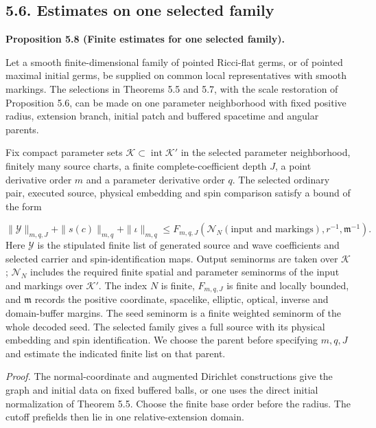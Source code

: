 \documentclass[
  english,
  11pt,
  reqno]{amsart}
\makeatletter
\newcommand{\pandocstatementheading}[1]{%
  \par\addpenalty{\@beginparpenalty}%
  \addvspace{.5\baselineskip plus .2\baselineskip minus .2\baselineskip}%
  {\normalfont\bfseries #1\par}%
  \nobreak\@afterindenttrue\@afterheading
}
\makeatother
\begin{document}
\subsection{5.6. Estimates on one selected
family}\label{estimates-on-one-selected-family}\label{sec:submission-selected-family-estimates}

\pandocstatementheading{\leavevmode{}\label{prop:submission-coverage-family-estimates}Proposition 5.8 (Finite estimates for one selected family).}

Let a smooth finite-dimensional family of pointed Ricci-flat germs, or
of pointed maximal initial germs, be supplied on common local
representatives with smooth markings. The selections in Theorems 5.5 and
5.7, with the scale restoration of Proposition 5.6, can be made on one
parameter neighborhood with fixed positive radius, extension branch,
initial patch and buffered spacetime and angular parents.

Fix compact parameter sets
\(\mathcal K\subset\operatorname{int}\mathcal K'\) in the selected
parameter neighborhood, finitely many source charts, a finite
complete-coefficient depth \(J\), a point derivative order \(m\) and a
parameter derivative order \(q\). The selected ordinary pair, executed
source, physical embedding and spin comparison satisfy a bound of the
form

\label{eq:submission-coverage-family-bound} \[
\|\mathcal Y\|_{m,q,J}
+
\|s(c)\|_{m,q}
+
\|\iota\|_{m,q}
\le
F_{m,q,J}
\left(
\mathcal N_N(\text{input and markings}),
r^{-1},
\mathfrak m^{-1}
\right).
\] Here \(\mathcal Y\) is the stipulated finite list of generated source
and wave coefficients and selected carrier and spin-identification maps.
Output seminorms are taken over \(\mathcal K\); \(\mathcal N_N\)
includes the required finite spatial and parameter seminorms of the
input and markings over \(\mathcal K'\). The index \(N\) is finite,
\(F_{m,q,J}\) is finite and locally bounded, and \(\mathfrak m\) records
the positive coordinate, spacelike, elliptic, optical, inverse and
domain-buffer margins. The seed seminorm is a finite weighted seminorm
of the whole decoded seed. The selected family gives a full source with
its physical embedding and spin identification. We choose the parent
before specifying \(m,q,J\) and estimate the indicated finite list on
that parent.

\emph{Proof.} The normal-coordinate and augmented Dirichlet
constructions give the graph and initial data on fixed buffered balls,
or one uses the direct initial normalization of Theorem 5.5. Choose the
finite base order before the radius. The cutoff prefields then lie in
one relative-extension domain.
\end{document}
